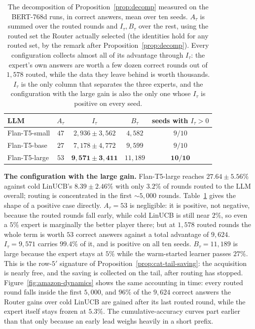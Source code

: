 \documentclass[anon]{alt2027} %
\begin{document}
\begin{table}[h]
\centering
\caption{The decomposition of Proposition~\ref{prop:decomp} measured on the
BERT-768d runs, in correct answers, mean over ten seeds. $A_\tau$ is summed
over the routed rounds and $I_\tau,B_\tau$ over the rest, using the routed set
the Router actually selected (the identities hold for any routed set, by the
remark after Proposition~\ref{prop:decomp}). Every configuration collects
almost all of its advantage through $I_\tau$: the expert's own answers are
worth a few dozen correct rounds out of $1{,}578$ routed, while the data they
leave behind is worth thousands. $I_\tau$ is the only column that separates
the three experts, and the configuration with the large gain is also the only one whose
$I_\tau$ is positive on every seed.}
\label{tab:amazon-decomp}
\small
\begin{tabular}{@{}lcccc@{}}
\toprule
LLM & $A_\tau$ & $I_\tau$ & $B_\tau$ & seeds with $I_\tau>0$ \\
\midrule
Flan-T5-small  & $47$ & $2{,}936\pm3{,}562$ & $4{,}582$ & $9/10$ \\
Flan-T5-base   & $27$ & $7{,}178\pm4{,}772$ & $9{,}599$ & $9/10$ \\
Flan-T5-large  & $53$ & $\mathbf{9{,}571\pm3{,}411}$ & $11{,}189$ & $\mathbf{10/10}$ \\
\bottomrule
\end{tabular}
\end{table}

\textbf{The configuration with the large gain.} Flan-T5-large reaches
$27.64\pm5.56\%$ against cold LinUCB's $8.39\pm2.46\%$ with only $3.2\%$ of
rounds routed to the LLM overall; routing is concentrated in the first
$\sim5{,}000$ rounds. Table~\ref{tab:amazon-decomp} gives the shape of a
positive case directly. $A_{\tau}=53$ is negligible: it is positive, not
negative, because the routed rounds fall early, while cold LinUCB is still
near $2\%$, so even a $5\%$ expert is marginally the better player there; but
at $1{,}578$ routed rounds the whole term is worth $53$ correct answers
against a total advantage of $9{,}624$. $I_{\tau}=9{,}571$ carries $99.4\%$ of
it, and is positive on all ten seeds. $B_{\tau}=11{,}189$ is large because the
expert stays at $5\%$ while the warm-started learner passes $27\%$. This is
the row-$5'$ signature of Proposition~\ref{prop:cat-tail-saving}: the
acquisition is nearly free, and the saving is collected on the tail, after
routing has stopped. Figure~\ref{fig:amazon-dynamics} shows the same
accounting in time: every routed round falls inside the first $5{,}000$, and
$96\%$ of the $9{,}624$ correct answers the Router gains over cold LinUCB are
gained after its last routed round, while the expert itself stays frozen at
$5.3\%$. The cumulative-accuracy curves part earlier than that only because an
early lead weighs heavily in a short prefix.
\end{document}
